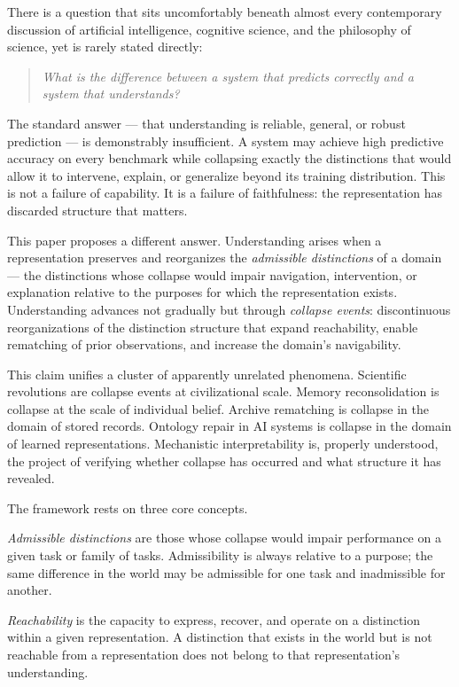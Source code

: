 \documentclass[11pt, a4paper]{article}
\theoremstyle{plain}
\theoremstyle{definition}
\theoremstyle{remark}
\begin{document}
There is a question that sits uncomfortably beneath almost every
contemporary discussion of artificial intelligence, cognitive science,
and the philosophy of science, yet is rarely stated directly:

\begin{quote}
\textit{What is the difference between a system that predicts correctly
and a system that understands?}
\end{quote}

The standard answer --- that understanding is reliable, general, or
robust prediction --- is demonstrably insufficient. A system may
achieve high predictive accuracy on every benchmark while collapsing
exactly the distinctions that would allow it to intervene, explain,
or generalize beyond its training distribution. This is not a failure
of capability. It is a failure of faithfulness: the representation
has discarded structure that matters.

This paper proposes a different answer. Understanding arises when a
representation preserves and reorganizes the \emph{admissible
distinctions} of a domain --- the distinctions whose collapse would
impair navigation, intervention, or explanation relative to the
purposes for which the representation exists. Understanding advances
not gradually but through \emph{collapse events}: discontinuous
reorganizations of the distinction structure that expand reachability,
enable rematching of prior observations, and increase the domain's
navigability.

This claim unifies a cluster of apparently unrelated phenomena.
Scientific revolutions are collapse events at civilizational scale.
Memory reconsolidation is collapse at the scale of individual belief.
Archive rematching is collapse in the domain of stored records.
Ontology repair in AI systems is collapse in the domain of learned
representations. Mechanistic interpretability is, properly understood,
the project of verifying whether collapse has occurred and what
structure it has revealed.

The framework rests on three core concepts.

\emph{Admissible distinctions} are those whose collapse would impair
performance on a given task or family of tasks. Admissibility is
always relative to a purpose; the same difference in the world may
be admissible for one task and inadmissible for another.

\emph{Reachability} is the capacity to express, recover, and operate
on a distinction within a given representation. A distinction that
exists in the world but is not reachable from a representation
does not belong to that representation's understanding.
\end{document}
